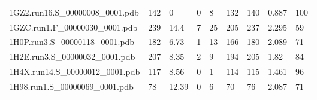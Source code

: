 \documentclass{bioinfo}
\begin{document}
\begin{table*}[!t]
{\begin{tabular}{lllllllll}
    1GZ2.run16.S\_00000008\_0001.pdb & 142      & 0          & 0           & 8           & 132         & 140     & 0.887           & 100          \\
    1GZC.run1.F\_00000030\_0001.pdb & 239      & 14.4       & 7           & 25          & 205         & 237     & 2.295           & 59           \\
    1H0P.run3.S\_00000118\_0001.pdb & 182      & 6.73       & 1           & 13          & 166         & 180     & 2.089           & 71           \\
    1H2E.run3.S\_00000032\_0001.pdb & 207      & 8.35       & 2           & 9           & 194         & 205     & 1.82            & 84           \\
    1H4X.run14.S\_00000012\_0001.pdb & 117      & 8.56       & 0           & 1           & 114         & 115     & 1.461           & 96           \\
    1H98.run1.S\_00000069\_0001.pdb & 78       & 12.39      & 0           & 6           & 70          & 76      & 2.087           & 71           \\
\end{tabular}}{}
\end{table*}
\end{document}
